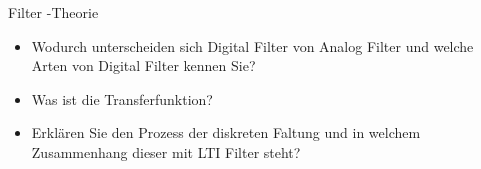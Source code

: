 
\begin{exercise}{Filter -Theorie }
\label{ex-de-mt-filter-1}

\begin{itemize}
\item Wodurch unterscheiden sich Digital Filter von Analog Filter und
  welche Arten von Digital Filter kennen Sie?
\item Was ist die Transferfunktion?
\item Erkl\"aren Sie den Prozess der diskreten Faltung und in welchem
  Zusammenhang dieser mit LTI Filter steht?
\end{itemize}
\end{exercise}
